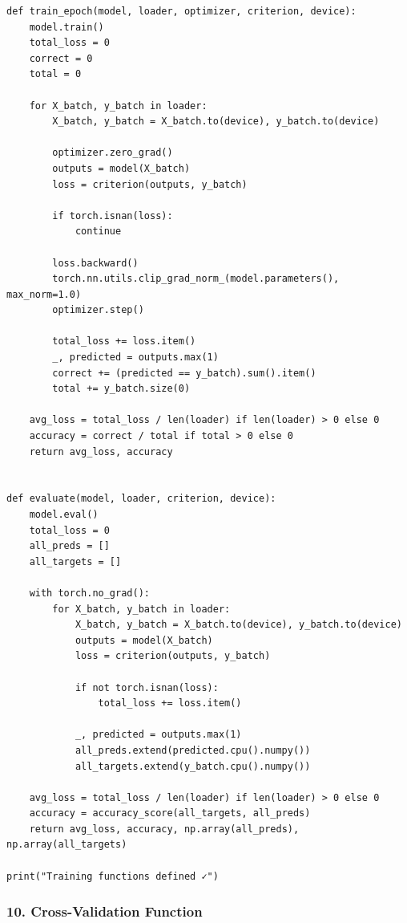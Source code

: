 \begin{lstlisting}
def train_epoch(model, loader, optimizer, criterion, device):
    model.train()
    total_loss = 0
    correct = 0
    total = 0
 
    for X_batch, y_batch in loader:
        X_batch, y_batch = X_batch.to(device), y_batch.to(device)
 
        optimizer.zero_grad()
        outputs = model(X_batch)
        loss = criterion(outputs, y_batch)
 
        if torch.isnan(loss):
            continue
 
        loss.backward()
        torch.nn.utils.clip_grad_norm_(model.parameters(), max_norm=1.0)
        optimizer.step()
 
        total_loss += loss.item()
        _, predicted = outputs.max(1)
        correct += (predicted == y_batch).sum().item()
        total += y_batch.size(0)
 
    avg_loss = total_loss / len(loader) if len(loader) > 0 else 0
    accuracy = correct / total if total > 0 else 0
    return avg_loss, accuracy
 
 
def evaluate(model, loader, criterion, device):
    model.eval()
    total_loss = 0
    all_preds = []
    all_targets = []
 
    with torch.no_grad():
        for X_batch, y_batch in loader:
            X_batch, y_batch = X_batch.to(device), y_batch.to(device)
            outputs = model(X_batch)
            loss = criterion(outputs, y_batch)
 
            if not torch.isnan(loss):
                total_loss += loss.item()
 
            _, predicted = outputs.max(1)
            all_preds.extend(predicted.cpu().numpy())
            all_targets.extend(y_batch.cpu().numpy())
 
    avg_loss = total_loss / len(loader) if len(loader) > 0 else 0
    accuracy = accuracy_score(all_targets, all_preds)
    return avg_loss, accuracy, np.array(all_preds), np.array(all_targets)
 
print("Training functions defined ✓")
\end{lstlisting}
 
\subsubsection*{10. Cross-Validation Function}
 
